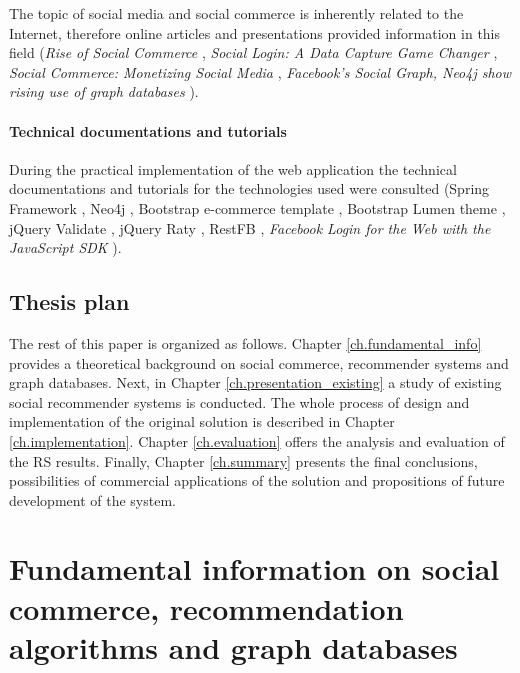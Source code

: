 \documentclass[12pt]{report}
\begin{document}
The topic of social media and social commerce is inherently related to the Internet, therefore online articles and presentations provided information in this field (\textit{Rise of Social Commerce} \cite{rise_of_social_commerce}, \textit{Social Login: A Data Capture Game Changer} \cite{social_login}, \textit{Social Commerce: Monetizing Social Media} \cite{social_commerce_syzygy}, \textit{Facebook's Social Graph, Neo4j show rising use of graph databases} \cite{facebook_social_graph}).

\subsubsection{Technical documentations and tutorials}

During the practical implementation of the web application the technical documentations and tutorials for the technologies used were consulted (Spring Framework \cite{spring_framework}, Neo4j \cite{neo4j}, Bootstrap e-commerce template \cite{bootply_ecommerce}, Bootstrap Lumen theme \cite{lumen}, jQuery Validate \cite{jquery_validate}, jQuery Raty \cite{jquery_raty}, RestFB \cite{restfb}, \textit{Facebook Login for the Web with the JavaScript SDK} \cite{facebook_login_web}). 


\section{Thesis plan}

The rest of this paper is organized as follows. Chapter \ref{ch.fundamental_info} provides a theoretical background on social commerce, recommender systems and graph databases. Next, in Chapter \ref{ch.presentation_existing} a study of existing social recommender systems is conducted. The whole process of design and implementation of the original solution is described in Chapter \ref{ch.implementation}. Chapter \ref{ch.evaluation} offers the analysis and evaluation of the RS results. Finally, Chapter \ref{ch.summary} presents the final conclusions, possibilities of commercial applications of the solution and propositions of future development of the system.



\chapter{Fundamental information on social commerce, recommendation algorithms and graph databases}
\label{ch.fundamental_info}
\end{document}
